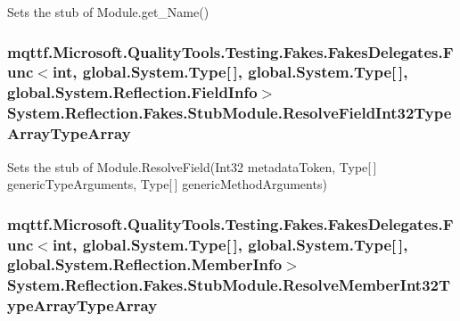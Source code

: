 Sets the stub of Module.\-get\-\_\-\-Name()

\hypertarget{class_system_1_1_reflection_1_1_fakes_1_1_stub_module_a60f0908f1a6df1a9af7cf5537d894dee}{
\subsubsection[{Resolve\-Field\-Int32\-Type\-Array\-Type\-Array}]{\setlength{\rightskip}{0pt plus 5cm}mqttf.\-Microsoft.\-Quality\-Tools.\-Testing.\-Fakes.\-Fakes\-Delegates.\-Func$<$int, global.\-System.\-Type\mbox{[}$\,$\mbox{]}, global.\-System.\-Type\mbox{[}$\,$\mbox{]}, global.\-System.\-Reflection.\-Field\-Info$>$ System.\-Reflection.\-Fakes.\-Stub\-Module.\-Resolve\-Field\-Int32\-Type\-Array\-Type\-Array}}\label{class_system_1_1_reflection_1_1_fakes_1_1_stub_module_a60f0908f1a6df1a9af7cf5537d894dee}


Sets the stub of Module.\-Resolve\-Field(\-Int32 metadata\-Token, Type\mbox{[}$\,$\mbox{]} generic\-Type\-Arguments, Type\mbox{[}$\,$\mbox{]} generic\-Method\-Arguments)

\hypertarget{class_system_1_1_reflection_1_1_fakes_1_1_stub_module_af03721565d1455036f9c2df2f6bedc06}{
\subsubsection[{Resolve\-Member\-Int32\-Type\-Array\-Type\-Array}]{\setlength{\rightskip}{0pt plus 5cm}mqttf.\-Microsoft.\-Quality\-Tools.\-Testing.\-Fakes.\-Fakes\-Delegates.\-Func$<$int, global.\-System.\-Type\mbox{[}$\,$\mbox{]}, global.\-System.\-Type\mbox{[}$\,$\mbox{]}, global.\-System.\-Reflection.\-Member\-Info$>$ System.\-Reflection.\-Fakes.\-Stub\-Module.\-Resolve\-Member\-Int32\-Type\-Array\-Type\-Array}}\label{class_system_1_1_reflection_1_1_fakes_1_1_stub_module_af03721565d1455036f9c2df2f6bedc06}


